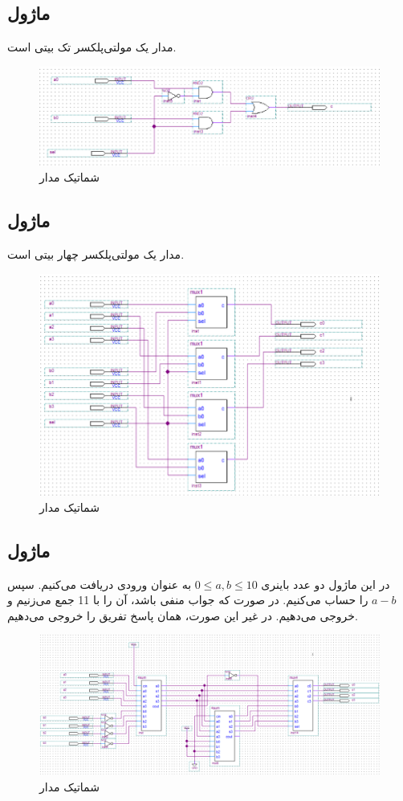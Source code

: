 \documentclass{perassignments}
\begin{document}
	\subsection{ماژول }
	مدار یک مولتی‌پلکسر تک بیتی است.
			\begin{figure}[H]
		\centering
		\includegraphics[width = 0.8 \textwidth]{graphics/mux1.png}
		\caption{شماتیک مدار }
	\end{figure}
		\subsection{ماژول }
	مدار یک مولتی‌پلکسر چهار بیتی است.
	\begin{figure}[H]
		\centering
		\includegraphics[width = 0.8 \textwidth]{graphics/mux4.png}
		\caption{شماتیک مدار }
	\end{figure}
	\subsection{ماژول }
	در این ماژول دو عدد باینری 
	\(0\leq a,b \leq 10\)
	به عنوان ورودی دریافت می‌کنیم. سپس 
	\(a - b\)
	را حساب می‌کنیم. در صورت که جواب منفی باشد، آن را با 
	11
	جمع می‌زنیم و خروجی می‌دهیم. در غیر این صورت، همان پاسخ تفریق را خروجی می‌دهیم.
	 	\begin{figure}[H]
	 	\centering
	 	\includegraphics[width = 0.8 \textwidth]{graphics/diff11.png}
	 	\caption{شماتیک مدار }
	 \end{figure}
\end{document}
